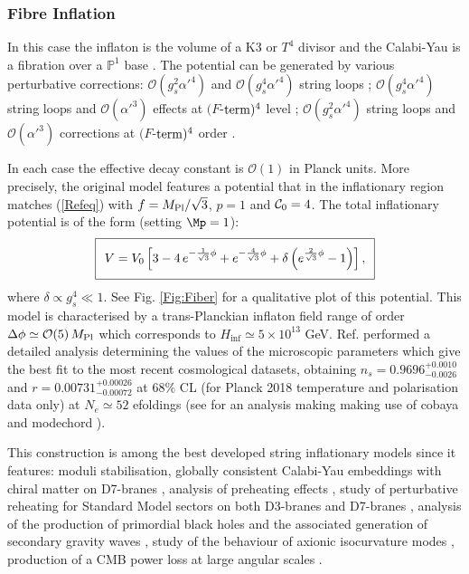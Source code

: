 \subsubsection*{Fibre Inflation}

In this case the inflaton is the volume of a K3 or $T^4$ divisor and the Calabi-Yau is a fibration over a $\mathbb{P}^1$ base \cite{Cicoli:2011it}. The potential can be generated by various perturbative corrections: $\mathcal{O}(g_s^2 \alpha'^4)$ and $\mathcal{O}(g_s^4 \alpha'^4)$ string loops \cite{Cicoli:2008gp}; $\mathcal{O}(g_s^4 \alpha'^4)$ string loops and $\mathcal{O}(\alpha'^3)$ effects at $(F$-${\rm term})^4$ level \cite{Broy:2015zba}; $\mathcal{O}(g_s^2 \alpha'^4)$ string loops and $\mathcal{O}(\alpha'^3)$ corrections at $(F$-${\rm term})^4$ order \cite{Cicoli:2016chb}. 

In each case the effective decay constant is $\mathcal{O}(1)$ in Planck units. More precisely, the original model features a potential that in the inflationary region matches (\ref{Refeq}) with $f=M_{\rm Pl}/\sqrt{3}$, $p=1$ and ${\cal C}_0=4$. The total inflationary potential is of the form (setting $\Mp=1$):
\begin{equation}
\setlength\fboxsep{0.25cm}
\setlength\fboxrule{0.4pt}
\boxed{
V =V_0\left[3-4\,e^{-\frac{1}{\sqrt{3}}\phi} + e^{-\frac{4}{\sqrt{3}}\phi} + \delta \left(e^{\frac{2}{\sqrt{3}}\phi}-1\right)\right],
}
\end{equation}
where $\delta \propto g_s^4 \ll 1$. See Fig. \ref{Fig:Fiber} for a qualitative plot of this potential. This model is characterised by a trans-Planckian inflaton field range of order $\Delta\phi\simeq \mathcal{O}(5)\,M_{\rm Pl}$ \cite{Cicoli:2018tcq} which corresponds to $H_{\text{inf}}\simeq 5\times 10^{13}$ GeV. Ref. \cite{Cicoli:2020bao} performed a detailed analysis determining the values of the microscopic parameters which give the best fit to the most recent cosmological datasets, obtaining $n_s = 0.9696^{+0.0010}_{-0.0026}$ and $r = 0.00731^{+0.00026}_{-0.00072}$ at $68\%$ CL (for Planck 2018 temperature and polarisation data only) at $N_e\simeq 52$ efoldings (see \cite{Bhattacharya:2020gnk} for an analysis making making use of cobaya \cite{Torrado:2020dgo}
and modechord \cite{Handley:2015fda}). 

This construction is among the best developed string inflationary models since it features: moduli stabilisation, globally consistent Calabi-Yau embeddings with chiral matter on D7-branes \cite{Cicoli:2016xae,Cicoli:2017axo}, analysis of preheating effects \cite{Antusch:2017flz,Gu:2018akj}, study of perturbative reheating for Standard Model sectors 
on both D3-branes \cite{Cicoli:2022uqa} and D7-branes \cite{Cicoli:2018cgu}, analysis of the production of primordial black holes \cite{Cicoli:2018asa} and the associated generation of secondary gravity waves \cite{Cicoli:2022sih}, study of the behaviour of axionic isocurvature modes \cite{Cicoli:2018ccr,Cicoli:2019ulk,Cicoli:2021yhb,Cicoli:2021itv}, production of a CMB power loss at large angular scales \cite{Cicoli:2013oba, Cicoli:2014bja}.


